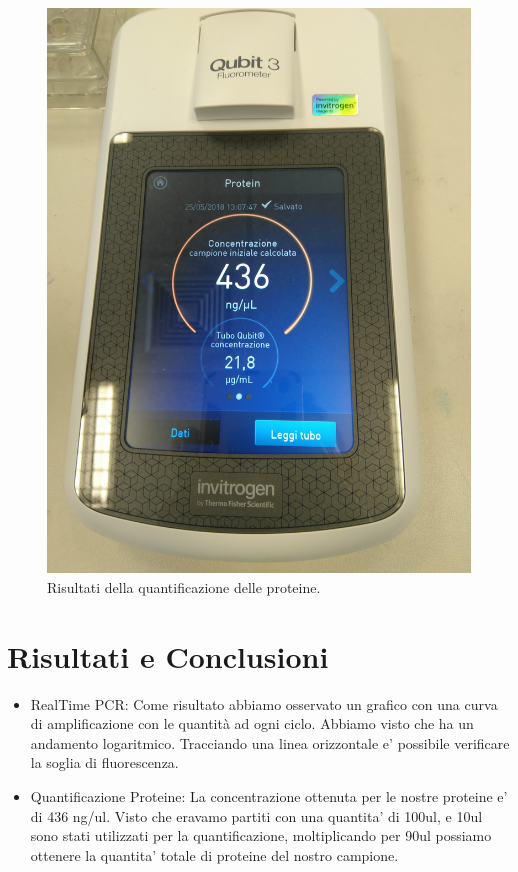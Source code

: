 \begin{figure}
  \includegraphics[width=\linewidth]{./immagini/qubit3.jpg}
  \caption{Risultati della quantificazione delle proteine.}
  \label{fig:qubit3}
\end{figure}

\section{Risultati e Conclusioni}

\begin{itemize}
\item RealTime PCR:
Come risultato abbiamo osservato un grafico con una curva di amplificazione 
con le quantit\`a ad ogni ciclo.
Abbiamo visto che ha un andamento logaritmico.
Tracciando una linea orizzontale e' possibile verificare la soglia di fluorescenza.\\

\item Quantificazione Proteine:
La concentrazione ottenuta per le nostre proteine e' di 436 ng/ul. Visto che eravamo partiti con una
quantita' di 100ul, e 10ul sono stati utilizzati per la quantificazione, moltiplicando per 90ul possiamo
ottenere la quantita' totale di proteine del nostro campione.
\end{itemize}
